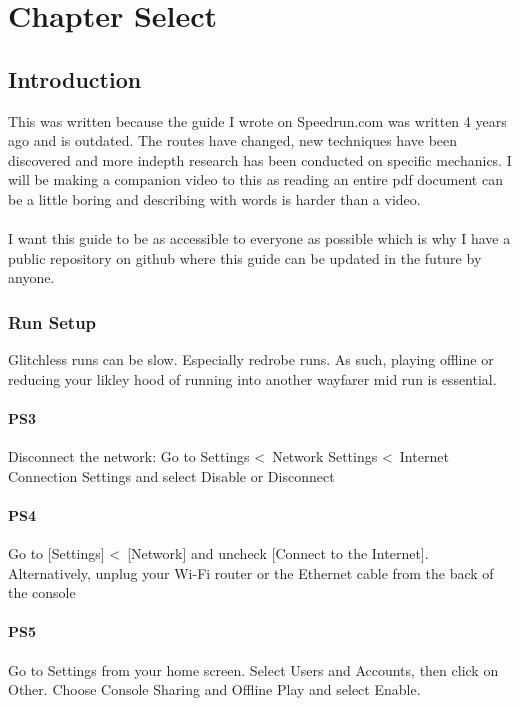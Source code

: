 \chapter{Chapter Select}
\section{Introduction}

This was written because the guide I wrote on Speedrun.com \autocite{journey_speedrun_guide} was written 4 years ago and 
is outdated. The routes have changed, new techniques have been discovered and 
more indepth research has been conducted on specific mechanics. I will be making a companion video to this as 
reading an entire pdf document can be a little boring and describing with words is harder than a video.
\\
\\
I want this guide to be as accessible to everyone as possible which is why I have a public repository on github
where this guide can be updated in the future by anyone. \\

\subsection*{Run Setup}

Glitchless runs can be slow. Especially redrobe runs. As such, playing offline or reducing your likley hood of
running into another wayfarer mid run is essential. 

\subsubsection{PS3}

Disconnect the network: Go to Settings \textless\  Network Settings \textless\  Internet Connection Settings and select Disable or Disconnect

\subsubsection{PS4}

Go to [Settings] \textless\  [Network] and uncheck [Connect to the Internet].\\
Alternatively, unplug your Wi-Fi router or the Ethernet cable from the back of the console

\subsubsection{PS5}
Go to Settings from your home screen. Select Users and Accounts, then click on Other. 
Choose Console Sharing and Offline Play and select Enable.

